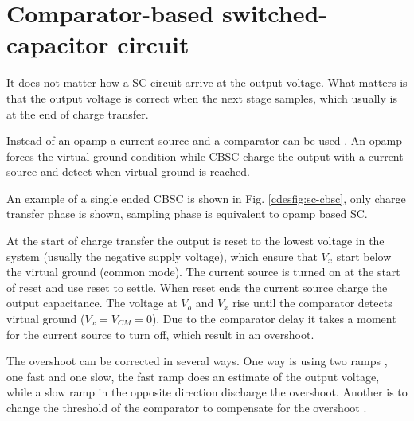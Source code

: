 \section{Comparator-based switched-capacitor circuit}\label{cdessc:cbsc}
It does not matter how a SC circuit arrive at the output
voltage. What matters is that the output voltage is correct when the 
next stage samples, which usually is at the end of charge transfer. 

Instead of an opamp a current source and a comparator can
be used \cite{sepke06}. An opamp forces the virtual ground condition
while CBSC charge the output with a current source and detect when
virtual ground is reached.

 An example of a single ended CBSC is shown in
Fig. \ref{cdesfig:sc-cbsc}, only charge transfer phase is shown, sampling
phase is equivalent to opamp based SC. 

At the start of charge transfer the output is reset to
the lowest voltage in the system (usually the negative supply
voltage), which ensure that $V_x$ start 
below the virtual ground (common mode). The current source is turned
on at the start of
reset and use reset to settle. When reset ends the current
source charge the output capacitance. The voltage at 
$V_o$ and $V_x$ rise until the comparator detects virtual ground ($V_x
 = V_{CM}=0$). Due to the comparator delay it takes a moment for the
 current source to turn off, which result in an overshoot. 

The
 overshoot can be corrected in several ways. One way is using two
 ramps \cite{sepke06}, one fast and
 one slow, the fast ramp does an estimate of the output voltage, while
 a slow ramp in the opposite direction discharge the 
 overshoot. Another is to change the threshold of the
 comparator to compensate for the overshoot \cite{brooks07a}.


